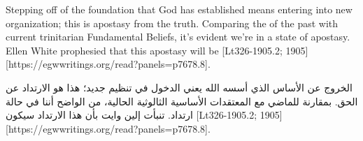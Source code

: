 Stepping off of the foundation that God has established means entering into new organization; this is apostasy from the truth. Comparing the  of the past with current trinitarian Fundamental Beliefs, it’s evident we’re in a state of apostasy.  Ellen White prophesied that this apostasy will be [Lt326-1905.2; 1905][https://egwwritings.org/read?panels=p7678.8].


الخروج عن الأساس الذي أسسه الله يعني الدخول في تنظيم جديد؛ هذا هو الارتداد عن الحق. بمقارنة  للماضي مع المعتقدات الأساسية الثالوثية الحالية، من الواضح أننا في حالة ارتداد. تنبأت إلين وايت بأن هذا الارتداد سيكون [Lt326-1905.2; 1905][https://egwwritings.org/read?panels=p7678.8].


